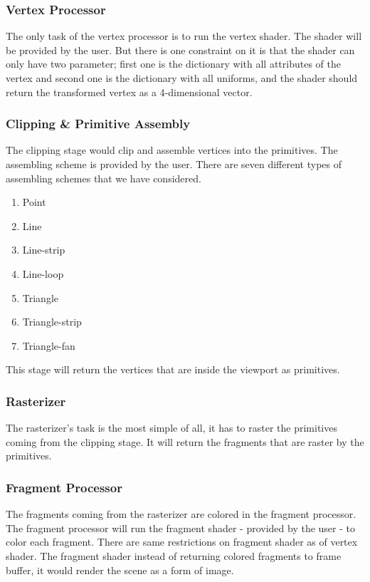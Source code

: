 \documentclass[a4paper]{article}
\theoremstyle{mytheoremstyle}
\theoremstyle{mytheoremstyle}
\theoremstyle{myproblemstyle}
\begin{document}
\subsubsection{Vertex Processor}
The only task of the vertex processor is to run the vertex shader. The shader will be provided by the user. But there is one constraint on it is that the shader can only have two parameter; first one is the dictionary with all attributes of the vertex and second one is the dictionary with all uniforms, and the shader should return the transformed vertex as a 4-dimensional vector.

\subsubsection{Clipping \& Primitive Assembly}
The clipping stage would clip and assemble vertices into the primitives. The assembling scheme is provided by the user. There are seven different types of assembling schemes that we have considered.
\begin{enumerate}
    \item Point
    \item Line
    \item Line-strip
    \item Line-loop
    \item Triangle
    \item Triangle-strip
    \item Triangle-fan
\end{enumerate}

This stage will return the vertices that are inside the viewport as primitives.

\subsubsection{Rasterizer}
The rasterizer's task is the most simple of all, it has to raster the primitives coming from the clipping stage. It will return the fragments that are raster by the primitives.

\subsubsection{Fragment Processor}
The fragments coming from the rasterizer are colored in the fragment processor. The fragment processor will run the fragment shader - provided by the user -  to color each fragment. There are same restrictions on fragment shader as of vertex shader. The fragment shader instead of returning colored fragments to frame buffer, it would render the scene as a form of image.
\end{document}
